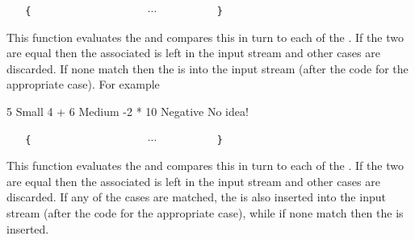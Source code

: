 \documentclass[oneside]{book}
\begin{document}
\begin{function}{\intCaseF}
\begin{syntax}
 
~ ~ \verb|{|
~ ~ ~ ~  
~ ~ ~ ~  
~ ~ ~ ~ $\cdots$
~ ~ ~ ~  
~ ~ \verb|}|
~ ~ 
\end{syntax}
This function evaluates the  and
compares this in turn to each of the
. If the two are equal then the
associated  is left in the input stream
and other cases are discarded. If none
match then the  is into the input stream
(after the code for the appropriate case).
For example
\begin{demohigh}
\IgnoreSpacesOn
{}
  {
    { 5 }       { Small }
    { 4 + 6 }   { Medium }
    { -2 * 10 } { Negative }
  }
  { No idea! }
\IgnoreSpacesOff
\end{demohigh}
\end{function}

\begin{function}{\intCaseTF}
\begin{syntax}
 
~ ~ \verb|{|
~ ~ ~ ~  
~ ~ ~ ~  
~ ~ ~ ~ $\cdots$
~ ~ ~ ~  
~ ~ \verb|}|
~ ~ 
~ ~ 
\end{syntax}
This function evaluates the  and
compares this in turn to each of the
. If the two are equal then the
associated  is left in the input stream
and other cases are discarded. If any of the
cases are matched, the  is also inserted into the
input stream (after the code for the appropriate case), while if none
match then the  is inserted.
\end{function}
\end{document}

